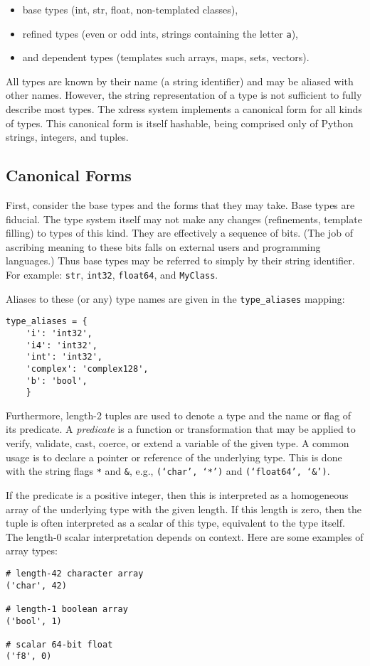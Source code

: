 \documentclass{ansconfpaper}
\newcommand{\vin}[1]{\texttt{{#1}}}
\begin{document}
\begin{itemize}
    \item base types (int, str, float, non-templated classes),
    \item refined types (even or odd ints, strings containing the letter \vin{a}),
    \item and dependent types (templates such arrays, maps, sets, vectors).
\end{itemize}

All types are known by their name (a string identifier) and may be aliased with 
other names.  However, the string representation of a type is not sufficient to 
fully describe most types.  The xdress system implements a canonical form for all 
kinds of types.  This canonical form is itself hashable, being comprised only of 
Python strings, integers, and tuples.

\subsection{Canonical Forms}
\label{sec:canon}

First, consider the base types and the forms that they may take.  Base types
are fiducial.  The type system itself may not make any changes (refinements, 
template filling) to types of this kind.  They are effectively a sequence of bits.
(The job of ascribing meaning to these bits falls on external users and programming 
languages.)  Thus base types may be referred to simply by their string identifier.  
For example: \vin{str}, \vin{int32}, \vin{float64}, and \vin{MyClass}.

Aliases to these (or any) type names are given in the \vin{type\_aliases} 
mapping:
\begin{lstlisting}
type_aliases = {
    'i': 'int32',
    'i4': 'int32',
    'int': 'int32',
    'complex': 'complex128',
    'b': 'bool',
    }
\end{lstlisting}

Furthermore, length-2 tuples are used to denote a type and the name or flag of its
predicate.  A \emph{predicate }is a function or transformation that may be applied to 
verify, validate, cast, coerce, or extend a variable of the given type.  A common 
usage is to declare a pointer or reference of the underlying type.  This is done with 
the string flags \vin{*} and \vin{\&}, e.g.,  \vin{(`char', `*')} and 
\vin{(`float64', `\&')}.

If the predicate is a positive integer, then this is interpreted as a 
homogeneous array of the underlying type with the given length.  If this length 
is zero, then the tuple is often interpreted as a scalar of this type, equivalent 
to the type itself.  The length-0 scalar interpretation depends on context.  Here 
are some examples of array types:
\begin{lstlisting}
# length-42 character array
('char', 42)  

# length-1 boolean array
('bool', 1)   

# scalar 64-bit float
('f8', 0)     
\end{lstlisting}
\end{document}
